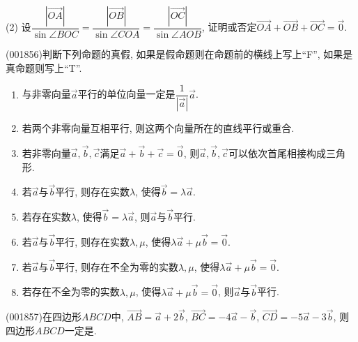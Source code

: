 (2) 设$\dfrac{|\overrightarrow{OA}|}{\sin\angle BOC}=\dfrac{|\overrightarrow{OB}|}{\sin\angle COA}=\dfrac{|\overrightarrow{OC}|}{\sin\angle AOB}$, 证明或否定$\overrightarrow{OA}+\overrightarrow{OB}+\overrightarrow{OC}=\overrightarrow{0}$.
\item (001856)判断下列命题的真假, 如果是假命题则在命题前的横线上写上``F'', 如果是真命题则写上``T''.\\ 
\begin{enumerate}[\blank{30}(1)]
\item 与非零向量$\overrightarrow{a}$平行的单位向量一定是$\dfrac{1}{|\overrightarrow{a}|}\overrightarrow{a}$.\\ 
\item 若两个非零向量互相平行, 则这两个向量所在的直线平行或重合.\\ 
\item 若非零向量$\overrightarrow{a},\overrightarrow{b},\overrightarrow{c}$满足$\overrightarrow{a}+\overrightarrow{b}+\overrightarrow{c}=\overrightarrow{0}$, 则$\overrightarrow{a},\overrightarrow{b},\overrightarrow{c}$可以依次首尾相接构成三角形.\\ 
\item 若$\overrightarrow{a}$与$\overrightarrow{b}$平行, 则存在实数$\lambda$, 使得$\overrightarrow{b}=\lambda\overrightarrow{a}$.\\ 
\item 若存在实数$\lambda$, 使得$\overrightarrow{b}=\lambda\overrightarrow{a}$, 则$\overrightarrow{a}$与$\overrightarrow{b}$平行.\\ 
\item 若$\overrightarrow{a}$与$\overrightarrow{b}$平行, 则存在实数$\lambda,\mu$, 使得$\lambda\overrightarrow{a}+\mu\overrightarrow{b}=\overrightarrow{0}$.\\ 
\item 若$\overrightarrow{a}$与$\overrightarrow{b}$平行, 则存在不全为零的实数$\lambda,\mu$, 使得$\lambda\overrightarrow{a}+\mu\overrightarrow{b}=\overrightarrow{0}$.\\ 
\item 若存在不全为零的实数$\lambda,\mu$, 使得$\lambda\overrightarrow{a}+\mu\overrightarrow{b}=\overrightarrow{0}$, 则$\overrightarrow{a}$与$\overrightarrow{b}$平行.\\ 
\end{enumerate}
\item (001857)在四边形$ABCD$中, $\overrightarrow{AB}=\overrightarrow{a}+2\overrightarrow{b}$, $\overrightarrow{BC}=-4\overrightarrow{a}-\overrightarrow{b}$, $\overrightarrow{CD}=-5\overrightarrow{a}-3\overrightarrow{b}$, 则四边形$ABCD$一定是.
